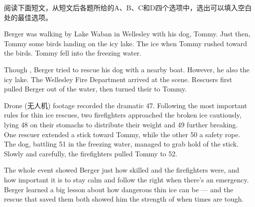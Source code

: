 \documentclass{英语试卷}
\begin{document}
\par 阅读下面短文，从短文后各题所给的A、B、C和D四个选项中，选出可以填入空白处的最佳选项。\par
\par Berger was walking by Lake Waban in Wellesley with his dog, Tommy. Just then, Tommy  some birds landing on the icy lake. The ice  when Tommy rushed toward the birds. Tommy fell into the freezing water.\par
\par Though , Berger tried to rescue his dog with a nearby boat. However, he also  the icy lake. The Wellesley Fire Department  arrived at the scene. Rescuers first pulled Berger out of the water, then turned their  to Tommy.\par
\par Drone (无人机) footage recorded the dramatic \blanknum{} 47\blanknum{}. Following the most important rules for thin ice rescues, two firefighters approached the broken ice cautiously, lying \blanknum{} 48\blanknum{} on their stomachs to distribute their weight and \blanknum{} 49\blanknum{} further breaking. One rescuer extended a stick toward Tommy, while the other \blanknum{} 50\blanknum{} a safety rope. The dog, battling \blanknum{} 51\blanknum{} in the freezing water, managed to grab hold of the stick. Slowly and carefully, the firefighters pulled Tommy to \blanknum{} 52\blanknum{}.\par
\par The whole event showed Berger just how skilled and  the firefighters were, and how important it is to stay calm and follow the right  when there's an emergency. Berger learned a big lesson about how dangerous thin ice can be — and the rescue that saved them both showed him the strength of  when times are tough.\par
{}
\end{document}
